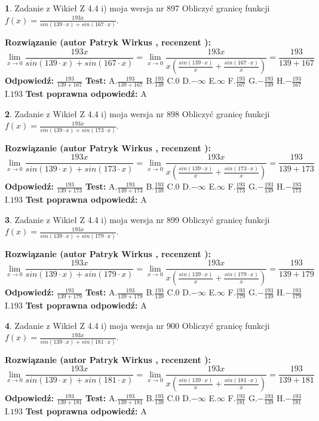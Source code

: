 \documentclass[12pt, a4paper]{article}
\theoremstyle{definition} %
\newtheorem{zad}{}
\newcommand{\zadStart}[1]{\begin{zad}#1\newline}
\newcommand{\zadStop}{\end{zad}}
\newcommand{\rozwStart}[2]{\noindent \textbf{Rozwiązanie (autor #1 , recenzent #2): }\newline}
\newcommand{\rozwStop}{\newline}
\newcommand{\odpStart}{\noindent \textbf{Odpowiedź:}\newline}
\newcommand{\odpStop}{\newline}
\newcommand{\testStart}{\noindent \textbf{Test:}\newline}
\newcommand{\testStop}{\newline}
\newcommand{\kluczStart}{\noindent \textbf{Test poprawna odpowiedź:}\newline}
\newcommand{\kluczStop}{\newline}
\begin{document}
\zadStart{Zadanie z Wikieł Z 4.4 i) moja wersja nr 897}
Obliczyć granicę funkcji $f(x)=\frac{193x}{sin(139\cdot x) +sin(167\cdot x)}$.
\zadStop
\rozwStart{Patryk Wirkus}{}
$$\lim\limits_{x\to 0}\frac{193x}{sin(139\cdot x) +sin(167\cdot x)}=\lim\limits_{x\to 0}\frac{193x}{x(\frac{sin(139\cdot x)}{x}+\frac{sin(167\cdot x)}{x})}=\frac{193}{139+167}$$
\rozwStop
\odpStart
$\frac{193}{139+167}$
\odpStop
\testStart
A.$\frac{193}{139+167}$
B.$\frac{193}{139}$
C.$0$
D.$-\infty$
E.$\infty$
F.$\frac{193}{167}$
G.$-\frac{193}{139}$
H.$-\frac{193}{167}$
I.$193$
\testStop
\kluczStart
A
\kluczStop



\zadStart{Zadanie z Wikieł Z 4.4 i) moja wersja nr 898}
Obliczyć granicę funkcji $f(x)=\frac{193x}{sin(139\cdot x) +sin(173\cdot x)}$.
\zadStop
\rozwStart{Patryk Wirkus}{}
$$\lim\limits_{x\to 0}\frac{193x}{sin(139\cdot x) +sin(173\cdot x)}=\lim\limits_{x\to 0}\frac{193x}{x(\frac{sin(139\cdot x)}{x}+\frac{sin(173\cdot x)}{x})}=\frac{193}{139+173}$$
\rozwStop
\odpStart
$\frac{193}{139+173}$
\odpStop
\testStart
A.$\frac{193}{139+173}$
B.$\frac{193}{139}$
C.$0$
D.$-\infty$
E.$\infty$
F.$\frac{193}{173}$
G.$-\frac{193}{139}$
H.$-\frac{193}{173}$
I.$193$
\testStop
\kluczStart
A
\kluczStop



\zadStart{Zadanie z Wikieł Z 4.4 i) moja wersja nr 899}
Obliczyć granicę funkcji $f(x)=\frac{193x}{sin(139\cdot x) +sin(179\cdot x)}$.
\zadStop
\rozwStart{Patryk Wirkus}{}
$$\lim\limits_{x\to 0}\frac{193x}{sin(139\cdot x) +sin(179\cdot x)}=\lim\limits_{x\to 0}\frac{193x}{x(\frac{sin(139\cdot x)}{x}+\frac{sin(179\cdot x)}{x})}=\frac{193}{139+179}$$
\rozwStop
\odpStart
$\frac{193}{139+179}$
\odpStop
\testStart
A.$\frac{193}{139+179}$
B.$\frac{193}{139}$
C.$0$
D.$-\infty$
E.$\infty$
F.$\frac{193}{179}$
G.$-\frac{193}{139}$
H.$-\frac{193}{179}$
I.$193$
\testStop
\kluczStart
A
\kluczStop



\zadStart{Zadanie z Wikieł Z 4.4 i) moja wersja nr 900}
Obliczyć granicę funkcji $f(x)=\frac{193x}{sin(139\cdot x) +sin(181\cdot x)}$.
\zadStop
\rozwStart{Patryk Wirkus}{}
$$\lim\limits_{x\to 0}\frac{193x}{sin(139\cdot x) +sin(181\cdot x)}=\lim\limits_{x\to 0}\frac{193x}{x(\frac{sin(139\cdot x)}{x}+\frac{sin(181\cdot x)}{x})}=\frac{193}{139+181}$$
\rozwStop
\odpStart
$\frac{193}{139+181}$
\odpStop
\testStart
A.$\frac{193}{139+181}$
B.$\frac{193}{139}$
C.$0$
D.$-\infty$
E.$\infty$
F.$\frac{193}{181}$
G.$-\frac{193}{139}$
H.$-\frac{193}{181}$
I.$193$
\testStop
\kluczStart
A
\kluczStop
\end{document}
